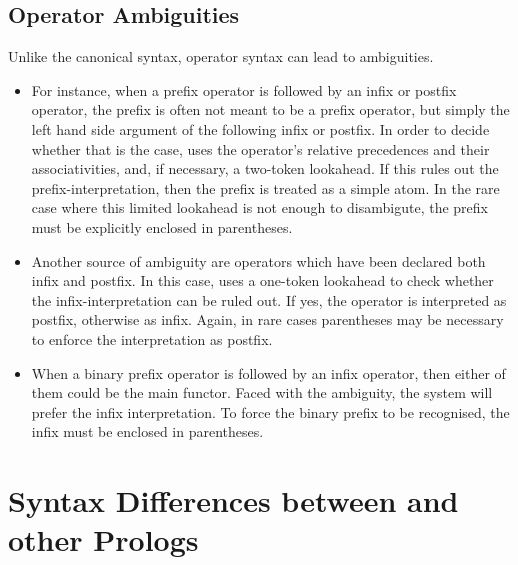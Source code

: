 \subsection{Operator Ambiguities}
Unlike the canonical syntax, operator syntax can lead to ambiguities.
\begin{itemize}
\item 
{}
For instance, when a prefix operator is followed by an infix or postfix
operator, the prefix is often not meant to be a prefix operator, but
simply the left hand side argument of the following infix or postfix.
In order to decide whether that is the case, {\eclipse} uses the operator's
relative precedences and their associativities, and, if necessary,
a two-token lookahead. If this rules out the prefix-interpretation, then
the prefix is treated as a simple atom. In the rare case where this
limited lookahead is not enough to disambigute, the prefix must be
explicitly enclosed in parentheses.

\item 
{}
Another source of ambiguity are operators which have been declared
both infix and postfix. In this case, {\eclipse} uses a one-token
lookahead to check whether the infix-interpretation can be ruled out.
If yes, the operator is interpreted as postfix, otherwise as infix.
Again, in rare cases parentheses may be necessary to enforce the
interpretation as postfix.

\item 
{}
When a binary prefix operator is followed by an infix operator, then
either of them could be the main functor. Faced with the ambiguity, the
system will prefer the infix interpretation. To force the binary prefix
to be recognised, the infix must be enclosed in parentheses.
\end{itemize}



\section{Syntax Differences between {\eclipse} and other Prologs}
\label{syntaxdiff}

